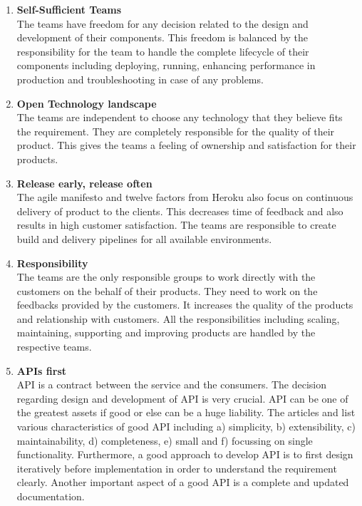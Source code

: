 \begin{enumerate}
\item \textbf{Self-Sufficient Teams}\\
The teams have freedom for any decision related to the design and development of their components. This freedom is balanced by the responsibility for the team to handle the complete lifecycle of their components including deploying, running, enhancing performance in production and troubleshooting in case of any problems.
\item \textbf{Open Technology landscape}\\
The teams are independent to choose any technology that they believe fits the requirement. They are completely responsible for the quality of their product. This gives the teams a feeling of ownership and satisfaction for their products.
\item \textbf{Release early, release often}\\
The agile manifesto and twelve factors from Heroku also focus on continuous delivery of product to the clients. This decreases time of feedback and also results in high customer satisfaction. The teams are responsible to create build and delivery pipelines for all available environments.
\item \textbf{Responsibility}\\
The teams are the only responsible groups to work directly with the customers on the behalf of their products. They need to work on the feedbacks provided by the customers. It increases the quality of the products and relationship with customers. All the responsibilities including scaling, maintaining, supporting and improving products are handled by the respective teams.
\item \textbf{\acrshort{API}s first}\\
\acrshort{API} is a contract between the service and the consumers. The decision regarding design and development of \acrshort{API} is very crucial. \acrshort{API} can be one of the greatest assets if good or else can be a huge liability. \cite{Bloch:2016aa} The articles \cite{Bloch:2016aa} and \cite{Blanchette:2008aa} list various characteristics of good \acrshort{API} including a) simplicity, b) extensibility, c) maintainability, d) completeness, e) small and f) focussing on single functionality. Furthermore, a good approach to develop \acrshort{API} is to first design iteratively before implementation in order to understand the requirement clearly. Another important aspect of a good \acrshort{API} is a complete and updated documentation.

\end{enumerate}
